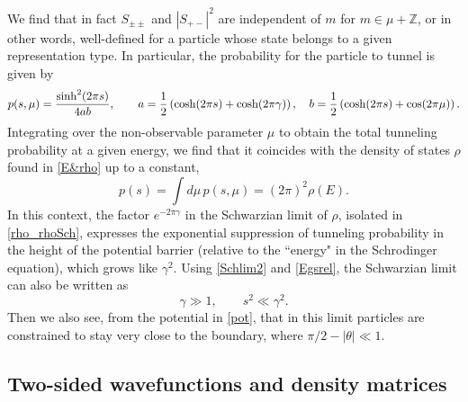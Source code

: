\documentclass[11pt]{article}
\newcommand{\be}{\begin{equation}}
\newcommand{\ee}{\end{equation}}
\newcommand{\ZZ}{\mathbb{Z}}
\newcommand{\tht}{\theta}
\newcommand{\om}{\omega}
\newcommand{\ga}{\gamma}
\newcommand{\Ga}{\Gamma}
\newcommand{\ov}{\over}
\begin{document}
We find that in fact $S_{\pm\pm}$ and $|S_{+-}|^2$ are independent of $m$ for $m\in\mu+\ZZ$, or in other words, well-defined for a particle whose state belongs to a given representation type. In particular, the probability for the particle to tunnel is given by
\be \label{tunp}
p(s, \mu)={\sinh^2(2 \pi s) \ov 4 a b}, \qquad a={1 \ov 2}\left( \cosh(2\pi s)+\cosh(2\pi\ga)\right),\quad b={1 \ov 2}\left( \cosh(2\pi s)+\cos (2\pi\mu)\right).
\ee
Integrating over the non-observable parameter $\mu$ to obtain the total tunneling probability at a given energy, we find that it coincides with the density of states $\rho$ found in \eqref{E&rho} up to a constant,
\be
p(s)=\int d\mu\, p(s, \mu)=(2\pi)^2 \rho(E).
\ee
In this context, the factor $e^{-2\pi\ga}$ in the Schwarzian limit of $\rho$, isolated in \eqref{rho_rhoSch}, expresses the exponential suppression of tunneling probability in the height of the potential barrier (relative to the ``energy" in the Schrodinger equation), which grows like $\ga^2$. Using \eqref{Schlim2} and \eqref{Egsrel}, the Schwarzian limit can also be written as
\be \label{Schlim3}
\ga \gg 1, \qquad s^2 \ll \ga^2.
\ee
Then we also see, from the potential in \eqref{pot}, that in this limit particles are constrained to stay very close to the boundary, where $\pi/2-|\tht| \ll 1$.



\subsection{Two-sided wavefunctions and density matrices}
\end{document}

